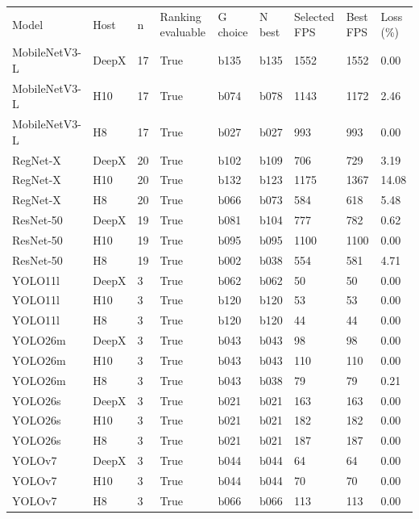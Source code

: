 \begin{tabular}{lllllllll}
Model & Host & n & Ranking evaluable & G choice & N best & Selected FPS & Best FPS & Loss (\%) \\
MobileNetV3-L & DeepX & 17 & True & b135 & b135 & 1552 & 1552 & 0.00 \\
MobileNetV3-L & H10 & 17 & True & b074 & b078 & 1143 & 1172 & 2.46 \\
MobileNetV3-L & H8 & 17 & True & b027 & b027 & 993 & 993 & 0.00 \\
RegNet-X & DeepX & 20 & True & b102 & b109 & 706 & 729 & 3.19 \\
RegNet-X & H10 & 20 & True & b132 & b123 & 1175 & 1367 & 14.08 \\
RegNet-X & H8 & 20 & True & b066 & b073 & 584 & 618 & 5.48 \\
ResNet-50 & DeepX & 19 & True & b081 & b104 & 777 & 782 & 0.62 \\
ResNet-50 & H10 & 19 & True & b095 & b095 & 1100 & 1100 & 0.00 \\
ResNet-50 & H8 & 19 & True & b002 & b038 & 554 & 581 & 4.71 \\
YOLO11l & DeepX & 3 & True & b062 & b062 & 50 & 50 & 0.00 \\
YOLO11l & H10 & 3 & True & b120 & b120 & 53 & 53 & 0.00 \\
YOLO11l & H8 & 3 & True & b120 & b120 & 44 & 44 & 0.00 \\
YOLO26m & DeepX & 3 & True & b043 & b043 & 98 & 98 & 0.00 \\
YOLO26m & H10 & 3 & True & b043 & b043 & 110 & 110 & 0.00 \\
YOLO26m & H8 & 3 & True & b043 & b038 & 79 & 79 & 0.21 \\
YOLO26s & DeepX & 3 & True & b021 & b021 & 163 & 163 & 0.00 \\
YOLO26s & H10 & 3 & True & b021 & b021 & 182 & 182 & 0.00 \\
YOLO26s & H8 & 3 & True & b021 & b021 & 187 & 187 & 0.00 \\
YOLOv7 & DeepX & 3 & True & b044 & b044 & 64 & 64 & 0.00 \\
YOLOv7 & H10 & 3 & True & b044 & b044 & 70 & 70 & 0.00 \\
YOLOv7 & H8 & 3 & True & b066 & b066 & 113 & 113 & 0.00 \\
\end{tabular}
